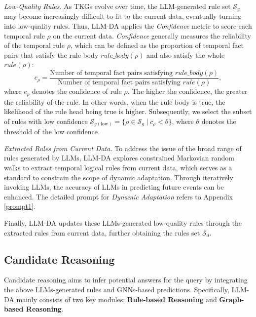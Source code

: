 \documentclass{article}
\begin{document}
\textit{Low-Quality Rules.} As TKGs evolve over time, the LLM-generated rule set $\mathcal{S}_g$ may become increasingly difficult to fit to the current data, eventually turning into low-quality rules. Thus, LLM-DA applies the \textit{Confidence} \citep{galarraga2013amie} metric to score each temporal rule $\rho$ on the current data. \textit{Confidence} generally measures the reliability of the temporal rule $\rho$, which can be defined as the proportion of temporal fact pairs that satisfy the rule body $rule\_body(\rho)$ and also satisfy the whole $rule(\rho)$:
    \begin{equation}
        c_\rho = \frac{\text{Number of temporal fact pairs satisfying } rule\_body(\rho)}{\text{Number of temporal fact pairs satisfying } rule(\rho)},
        \label{conf}
    \end{equation}
where $c_\rho$ denotes the confidence of rule $\rho$. The higher the confidence, the greater the reliability of the rule. In other words, when the rule body is true, the likelihood of the rule head being true is higher. Subsequently, we select the subset of rules with low confidence $\mathcal{S}_{g(\text{low})} = \{ \rho \in \mathcal{S}_g \mid c_{\rho} < \theta \}$,
where $\theta$ denotes the threshold of the low confidence.

\textit{Extracted Rules from Current Data.} To address the issue of the broad range of rules generated by LLMs, LLM-DA explores constrained Markovian random walks to extract temporal logical rules from current data, which serves as a standard to constrain the scope of dynamic adaptation. Through iteratively invoking LLMs, the accuracy of LLMs in predicting future events can be enhanced. 
The detailed prompt for \textit{Dynamic Adaptation} refers to Appendix \ref{prompt1}.

Finally, LLM-DA updates these LLMs-generated low-quality rules through the extracted rules from current data, further obtaining the rules set $\mathcal{S}_d$.

\subsection{Candidate Reasoning} 
Candidate reasoning aims to infer potential answers for the query by integrating the above LLMs-generated rules and GNNs-based predictions. Specifically, LLM-DA mainly consists of two key modules: \textbf{Rule-based Reasoning} and \textbf{Graph-based Reasoning}.
\end{document}
